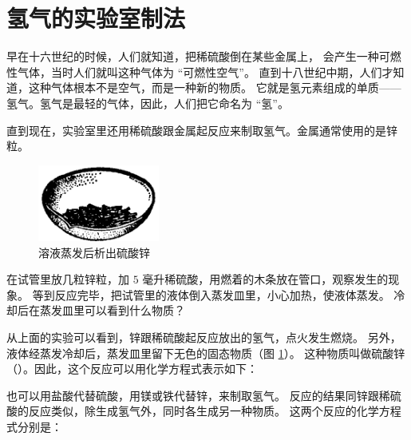 \section{氢气的实验室制法}\label{sec:2-2}

早在十六世纪的时候，人们就知道，把稀硫酸倒在某些金属上，
会产生一种可燃性气体，当时人们就叫这种气体为 “可燃性空气”。
直到十八世纪中期，人们才知道，这种气体根本不是空气，而是一种新的物质。
它就是氢元素组成的单质——氢气。氢气是最轻的气体，因此，人们把它命名为 “氢”。

直到现在，实验室里还用稀硫酸跟金属起反应来制取氢气。金属通常使用的是锌粒。

\begin{figure}
    \centering
    \includegraphics[width=4cm]{../pic/czhx1-ch2-2}
    \caption{溶液蒸发后析出硫酸锌}\label{fig:2-2}
\end{figure}

\wrapfiguretrick

\begin{shiyan}
    在试管里放几粒锌粒，加 $5$ 毫升稀硫酸，用燃着的木条放在管口，观察发生的现象。
    等到反应完毕，把试管里的液体倒入蒸发皿里，小心加热，使液体蒸发。
    冷却后在蒸发皿里可以看到什么物质？
\end{shiyan}

从上面的实验可以看到，锌跟稀硫酸起反应放出的氢气，点火发生燃烧。
另外，液体经蒸发冷却后，蒸发皿里留下无色的固态物质（图 \ref{fig:2-2}）。
这种物质叫做硫酸锌（）。因此，这个反应可以用化学方程式表示如下：
\begin{fangchengshi}
\end{fangchengshi}

也可以用盐酸代替硫酸，用镁或铁代替锌，来制取氢气。
反应的结果同锌跟稀硫酸的反应类似，除生成氢气外，同时各生成另一种物质。
这两个反应的化学方程式分别是：

\begin{fangchengshi}
     \\
\end{fangchengshi}

